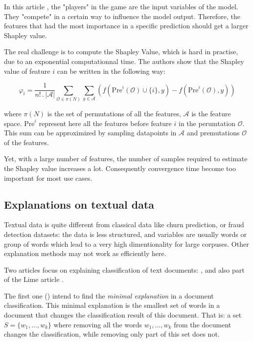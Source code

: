 \documentclass[a4paper,11pt]{kth-mag}
\begin{document}
In this article \cite{gametheory}, the "players" in the game are the input variables of the model. They "compete" in a certain way to influence the model output. Therefore, the features that had the most importance in a specific prediction should get a larger Shapley value.

The real challenge is to compute the Shapley Value, which is hard in practise, due to an exponential computationnal time. The authors show that the Shapley value of feature $i$ can be written in the following way:

\[
	\varphi_i = \frac1{n! \, . \, | \mathcal{A} |} \sum_{\mathcal{O} \in \pi(N)} \sum_{y \in \mathcal{A}} \left( f( \mathrm{Pre}^i(\mathcal{O}) \cup \{i\}, y) - f(\mathrm{Pre}^i(\mathcal{O}), y) \right)
\]

where $\pi(N)$ is the set of permutations of all the features, $\mathcal{A}$ is the feature space. $\mathrm{Pre}^i$ represent here all the features before feature $i$ in the perumtation $\mathcal{O}$. This sum can be approximized by sampling datapoints in $\mathcal{A}$ and premutations $\mathcal{O}$ of the features.

Yet, with a large number of features, the number of samples required to estimate the Shapley value increases a lot. Consequently convergence time become too important for most use cases.

\subsection{Explanations on textual data}

Textual data is quite different from classical data like churn prediction, or fraud detection datasets: the data is less structured, and variables are usually words or group of words which lead to a very high dimentionality for large corpuses. Other explanation methods may not work as efficiently here.

Two articles focus on explaining classification of text documents:  \cite{documentclassif}, and also part of the Lime article \cite{lime}.

The first one (\cite{documentclassif}) intend to find the \textit{minimal explanation} in a document classification. This minimal explanation is the smallest set of words in a document that changes the classification result of this document. That is: a set $S = \{w_1, ..., w_k\}$ where removing all the words $w_1, ..., w_k$ from the document changes the classification, while removing only part of this set does not.
\end{document}

